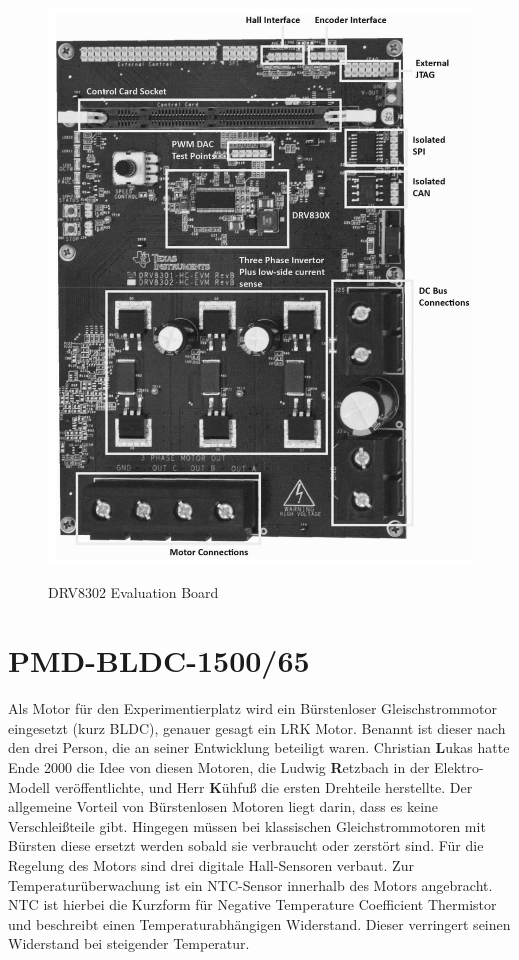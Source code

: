 \begin{figure}[htbp]
	\centering
	\includegraphics[width=\textwidth]{hardware/graphics/TI_Eval_Board}
	\caption{DRV8302 Evaluation Board}
	\quelle \cite{Instruments2014}
	\label{fig:DRV8302Board}
\end{figure}


\section{PMD-BLDC-1500/65}
Als Motor für den Experimentierplatz wird ein Bürstenloser Gleischstrommotor eingesetzt (kurz BLDC), genauer gesagt ein LRK Motor. 
Benannt ist dieser nach den drei Person, die an seiner Entwicklung beteiligt waren.
Christian \textbf{L}ukas hatte Ende 2000 die Idee von diesen Motoren, die Ludwig \textbf{R}etzbach in der Elektro-Modell veröffentlichte, und Herr \textbf{K}ühfuß die ersten Drehteile herstellte.
Der allgemeine Vorteil von Bürstenlosen Motoren liegt darin, dass es keine Verschleißteile gibt.
Hingegen müssen bei klassischen Gleichstrommotoren mit Bürsten diese ersetzt werden sobald sie verbraucht oder zerstört sind.
Für die Regelung des Motors sind drei digitale Hall-Sensoren verbaut.
Zur Temperaturüberwachung ist ein NTC-Sensor innerhalb des Motors angebracht. 
NTC ist hierbei die Kurzform für Negative Temperature Coefficient Thermistor und beschreibt einen Temperaturabhängigen Widerstand.
Dieser verringert seinen Widerstand bei steigender Temperatur.
